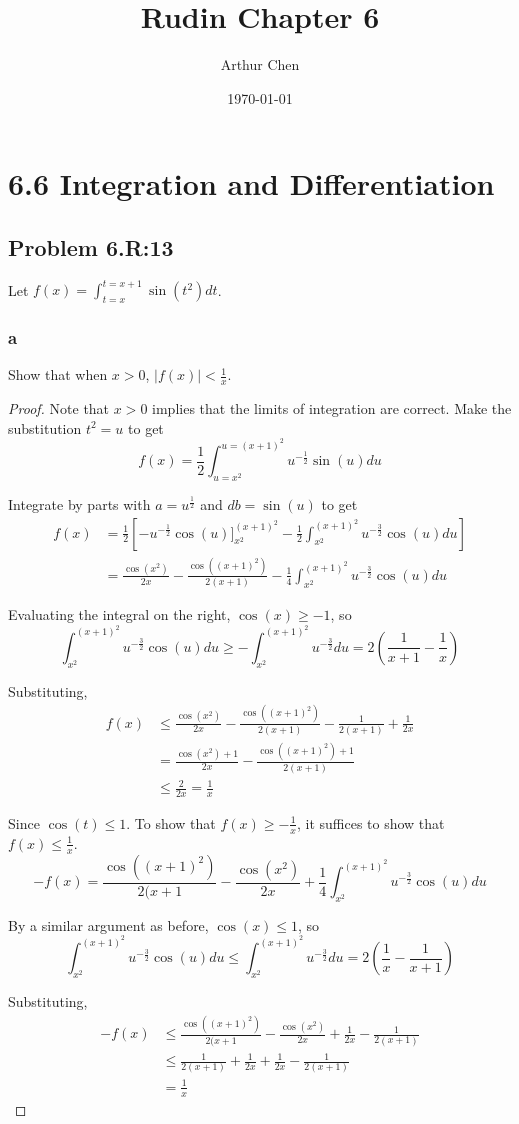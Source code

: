 \documentclass{amsart}
\author{Arthur Chen}
\title{Rudin Chapter 6}
\date{\today}
\begin{document}
\section*{6.6 Integration and Differentiation}

\subsection*{Problem 6.R:13}
Let $f(x) = \int_{t=x}^{t=x+1} \sin(t^2)dt$.
\subsubsection*{a}
Show that when $x>0$, $|f(x)| < \frac{1}{x}$. 

\begin{proof}
Note that $x>0$ implies that the limits of integration are correct. Make the substitution $t^2 = u$ to get
\[
f(x) = \frac{1}{2} \int_{u = x^2}^{u = (x+1)^2} u^{-\frac{1}{2}} \sin(u)du
\]

Integrate by parts with $a = u^{\frac{1}{2}}$ and $db = \sin(u)$ to get
\begin{align*}
f(x) &= \frac{1}{2}
\left[
-u^{-\frac{1}{2}}\cos(u)]_{x^2}^{(x+1)^2}
-\frac{1}{2} \int_{x^2}^{(x+1)^2} u^{-\frac{3}{2}} \cos(u)du
\right] \\
&= \frac{\cos(x^2)}{2x} - \frac{\cos((x+1)^2)}{2(x+1)} - \frac{1}{4} \int_{x^2}^{(x+1)^2} u^{-\frac{3}{2}} \cos(u)du
\end{align*}

Evaluating the integral on the right, $\cos(x) \geq -1$, so
\[
\int_{x^2}^{(x+1)^2} u^{-\frac{3}{2}} \cos(u)du
\geq - \int_{x^2}^{(x+1)^2} u^{-\frac{3}{2}} du
= 2 \left(\frac{1}{x+1} - \frac{1}{x} \right)
\]

Substituting,
\begin{align*}
f(x) &\leq \frac{\cos(x^2)}{2x} - \frac{\cos((x+1)^2)}{2(x+1)} - \frac{1}{2(x+1)} + \frac{1}{2x} \\
&= \frac{\cos(x^2) + 1}{2x} - \frac{\cos((x+1)^2) + 1}{2(x+1)} \\
& \leq \frac{2}{2x} = \frac{1}{x}
\end{align*}

Since $\cos(t) \leq 1$. To show that $f(x) \geq -\frac{1}{x}$, it suffices to show that $f(x) \leq \frac{1}{x}$.
\[
-f(x) = \frac{\cos((x+1)^2)}{2(x+1} - \frac{\cos(x^2)}{2x} + \frac{1}{4} \int_{x^2}^{(x+1)^2} u^{-\frac{3}{2}} \cos(u)du
\]

By a similar argument as before, $\cos(x) \leq 1$, so
\[
\int_{x^2}^{(x+1)^2} u^{-\frac{3}{2}} \cos(u)du
\leq \int_{x^2}^{(x+1)^2} u^{-\frac{3}{2}} du
= 2 \left(\frac{1}{x} - \frac{1}{x+1} \right)
\]

Substituting,
\begin{align*}
-f(x) &\leq \frac{\cos((x+1)^2)}{2(x+1} - \frac{\cos(x^2)}{2x} + \frac{1}{2x} - \frac{1}{2(x+1)} \\
&\leq \frac{1}{2(x+1)} + \frac{1}{2x} + \frac{1}{2x} - \frac{1}{2(x+1)} \\
&= \frac{1}{x}
\end{align*}

\end{proof}
\end{document}
